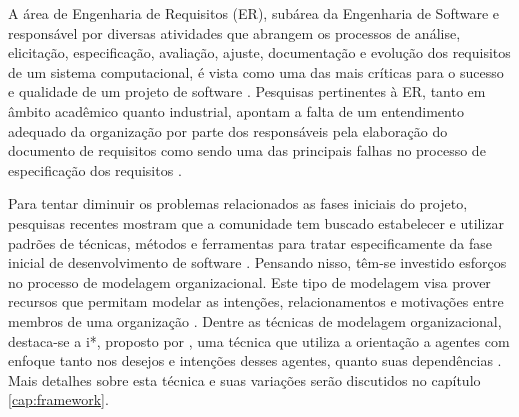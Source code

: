             A área de Engenharia de Requisitos (ER),
            subárea da Engenharia de Software e responsável por diversas atividades que abrangem os processos de análise, elicitação, especificação, avaliação, ajuste, documentação e evolução dos requisitos de um sistema computacional,
            é vista como uma das mais críticas para o sucesso e qualidade de um projeto de software
                \cite{sommerville1998requirements}.
            Pesquisas pertinentes à ER, tanto em âmbito acadêmico quanto industrial,
            apontam a falta de um entendimento adequado da organização por parte dos responsáveis pela elaboração do documento de requisitos
            como sendo uma das principais falhas no processo de especificação dos requisitos
                    \cite{van2000requirements}.

                Para tentar diminuir os problemas relacionados as fases iniciais do projeto,
                pesquisas recentes mostram que a comunidade tem buscado estabelecer e utilizar padrões de técnicas, métodos e ferramentas para tratar especificamente
                da fase inicial de desenvolvimento de software
                        \cite{schneider2013literature}.
                Pensando nisso,
                têm-se investido esforços no processo de modelagem organizacional.
                Este tipo de modelagem
                visa prover recursos que permitam modelar
                as intenções, relacionamentos e motivações
                entre membros de uma organização
                    \cite{mason1997conceptual}.
                Dentre as técnicas de modelagem organizacional,
                destaca-se a i*,
                proposto por
                    \cite{yu1993modeling},
                uma técnica que utiliza a orientação a agentes
                    \cite{yu2001agent}
                    com enfoque
                    tanto nos desejos e intenções desses agentes, quanto suas dependências
                        \cite{site2013iwiki}
                        \cite{yu1997towards}.
                Mais detalhes sobre esta técnica e suas variações serão discutidos no capítulo
                \ref{cap:framework}.

